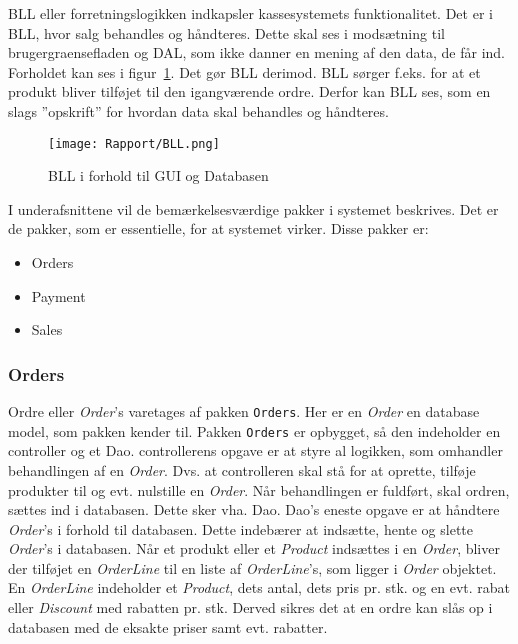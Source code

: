 \gls{BLL} eller \gls{forretningslogik}ken indkapsler kassesystemets funktionalitet. Det er i \gls{BLL}, hvor salg behandles og håndteres. Dette skal ses i modsætning til \Gls{brugergraenseflade}n og \gls{DAL}, som ikke danner en mening af den data, de får ind. Forholdet kan ses i figur~\ref{fig:bll}. Det gør \gls{BLL} derimod. \gls{BLL} sørger f.eks. for at et produkt bliver tilføjet til den igangværende ordre. Derfor kan \gls{BLL} ses, som en slags ''opskrift'' for hvordan data skal behandles og håndteres.

\begin{figure}[H]
	\centering
	\texttt{[image: Rapport/BLL.png]}
	\caption{BLL i forhold til GUI og Databasen}
	\label{fig:bll}
\end{figure}

I underafsnittene vil de bemærkelsesværdige pakker i systemet beskrives. Det er de pakker, som er essentielle, for at systemet virker. Disse pakker er:
\begin{itemize}
	\item Orders
	\item Payment
	\item Sales
\end{itemize}

\subsubsection{Orders}
Ordre eller \textit{Order}'s varetages af pakken \texttt{Orders}. Her er en \textit{Order} en database model, som pakken kender til. Pakken \texttt{Orders} er opbygget, så den indeholder en \Gls{controller} og et \gls{Dao}. \Gls{controller}ens opgave er at styre al logikken, som omhandler behandlingen af en \textit{Order}. Dvs. at \gls{controller}en skal stå for at oprette, tilføje produkter til og evt. nulstille en \textit{Order}. Når behandlingen er fuldført, skal ordren, sættes ind i databasen. Dette sker vha. \gls{Dao}. \gls{Dao}'s eneste opgave er at håndtere \textit{Order}'s i forhold til databasen. Dette indebærer at indsætte, hente og slette \textit{Order}'s i databasen.
\newline\newline
Når et produkt eller et \textit{Product} indsættes i en \textit{Order}, bliver der tilføjet en \textit{OrderLine} til en liste af \textit{OrderLine}'s, som ligger i \textit{Order} objektet. En \textit{OrderLine} indeholder et \textit{Product}, dets antal, dets pris pr. stk. og en evt. rabat eller \textit{Discount} med rabatten pr. stk. Derved sikres det at en ordre kan slås op i databasen med de eksakte priser samt evt. rabatter.


